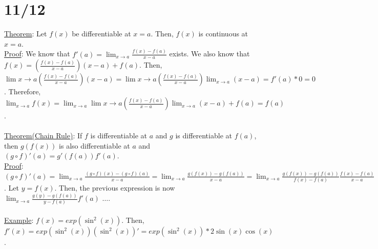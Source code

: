 \documentclass[11pt]{article}
\begin{document}
\section*{11/12}
	\underline{Theorem}: Let $f(x)$ be differentiable at $x=a$. Then,
	$f(x)$ is continuous at $x=a$.\\
	\underline{Proof}: We know that $f'(a) = \lim_{x \to a} \frac{f(x) - f(a)}
	{x-a}$ exists. We also know that $f(x) = \left(\frac{f(x) - f(a)}{x-a}
	\right) (x - a) + f(a)$. Then, $\lim{x \to a} \left(\frac{f(x) - f(a)}{x-a}
	\right) (x - a) = \lim{x \to a} \left(\frac{f(x) - f(a)}{x-a}\right) 
	\lim_{x \to a}(x - a) = f'(a) * 0 = 0$. Therefore, $\lim_{x \to a} f(x) =
	\lim_{x \to a} \lim{x \to a} \left(\frac{f(x) - f(a)}{x-a}\right) 
	\lim_{x \to a}(x - a) + f(a) = f(a)$.\\\\
	\underline{Theorem(Chain Rule)}: If $f$ is differentiable at $a$ and $g$
	is differentiable at $f(a)$, then $g(f(x))$ is also differentiable at $a$
	and $(g \circ f)'(a) = g'(f(a)) f'(a)$.\\
	\underline{Proof}: $(g \circ f)'(a) = \lim_{ x \to a} \frac{(g \circ f)
	(x) - (g \circ f)(a)}{x - a} = \lim_{x \to a} \frac{g(f(x))- g(f(a))}
	{x - a} = \lim_{x \to a} \frac{g(f(x))- g(f(a))}{f(x) - f(a)}
	\frac{f(x) - f(a)}{x - a}$. Let $y = f(x)$. Then, the previous expression
	is now $\lim_{x \to a} \frac{g(y)- g(f(a))}{y - f(a)}f'(a)$ $\ldots$.\\\\
	\underline{Example}: $f(x) = exp(\sin^2(x))$. Then, $f'(x) = exp(\sin^2(x))
	(\sin^2(x))' = exp(\sin^2(x))*2\sin(x)\cos(x)$.
	
\end{document}
